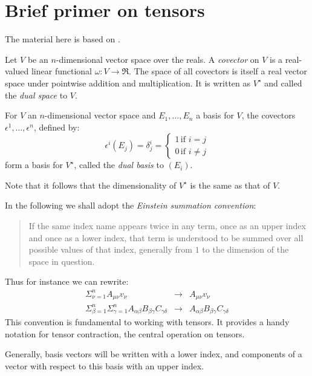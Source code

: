 \documentclass{article} %
\begin{document}
\section{Brief primer on tensors}\label{sec:tensor}
The material here is based on \cite{lee-book-2000,dullemond-1991-tensor}.


Let \(V\) be an \(n\)-dimensional vector space over the reals. A {\em covector} on \(V\) is a real-valued linear functional \(\omega:V\rightarrow \Re\). The space of all covectors is itself a real vector space  under pointwise addition and multiplication. It is written as \(V^{\star}\) and called the {\em dual space} to \(V\). 

\begin{proposition} For \(V\) an \(n\)-dimensional vector space and \(E_1, \ldots, E_n\) a basis for \(V\), the covectors \(\epsilon^1, \ldots, \epsilon^n\), defined by:
  \[
  \epsilon^i(E_j) = \delta^i_j = \left\{
  \begin{array}{l}
    1\, \mbox{if \(i =j\)} \\
    0\, \mbox{if \(i\not=j\)}
    \end{array}\right.
    \]
\noindent form a basis for \(V^{\star}\), called the {\em dual basis} to \((E_i)\).   
\end{proposition}
Note that it follows that the dimensionality of \(V^{\star}\) is the same as that of \(V\).

In the following we shall adopt the {\em Einstein summation convention}:
\begin{quotation}
  If the same index name appears twice in any term, once as an upper index and once as a lower index, that term is understood to be summed over all possible values of that index, generally from \(1\) to the dimension of the space in question. 
\end{quotation}
Thus for instance we can rewrite:
\[
\begin{array}{lcl}
  \Sigma_{\nu=1}^n A_{\mu\nu}v_{\nu} & \rightarrow &   A_{\mu\nu}v_{\nu}\\
  \Sigma_{\beta=1}^n \Sigma_{\gamma=1}^n A _{\alpha \beta}B_{\beta \gamma}C_{\gamma \delta} & \rightarrow & A_{\alpha \beta}B_{\beta \gamma}C_{\gamma \delta}
\end{array}
\]
This convention is fundamental to working with tensors. It provides a handy notation for tensor contraction, the central operation on tensors.

Generally, basis vectors will be written with a lower index, and components of a vector with respect to this basis with an upper index.
\end{document}
